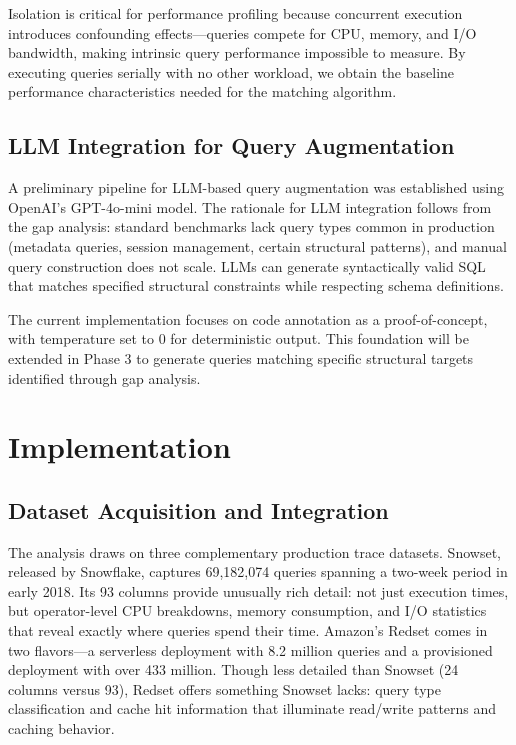 \documentclass[12pt]{report}
\begin{document}
Isolation is critical for performance profiling because concurrent execution introduces confounding effects---queries compete for CPU, memory, and I/O bandwidth, making intrinsic query performance impossible to measure. By executing queries serially with no other workload, we obtain the baseline performance characteristics needed for the matching algorithm.

\subsection{LLM Integration for Query Augmentation}
\label{subsec:llm-integration}

A preliminary pipeline for LLM-based query augmentation was established using OpenAI's GPT-4o-mini model. The rationale for LLM integration follows from the gap analysis: standard benchmarks lack query types common in production (metadata queries, session management, certain structural patterns), and manual query construction does not scale. LLMs can generate syntactically valid SQL that matches specified structural constraints while respecting schema definitions.

The current implementation focuses on code annotation as a proof-of-concept, with temperature set to 0 for deterministic output. This foundation will be extended in Phase 3 to generate queries matching specific structural targets identified through gap analysis.

\section{Implementation}
\label{sec:implementation}

\subsection{Dataset Acquisition and Integration}
\label{subsec:dataset-acquisition}

The analysis draws on three complementary production trace datasets. Snowset, released by Snowflake, captures 69,182,074 queries spanning a two-week period in early 2018. Its 93 columns provide unusually rich detail: not just execution times, but operator-level CPU breakdowns, memory consumption, and I/O statistics that reveal exactly where queries spend their time. Amazon's Redset comes in two flavors---a serverless deployment with 8.2 million queries and a provisioned deployment with over 433 million. Though less detailed than Snowset (24 columns versus 93), Redset offers something Snowset lacks: query type classification and cache hit information that illuminate read/write patterns and caching behavior.
\end{document}
